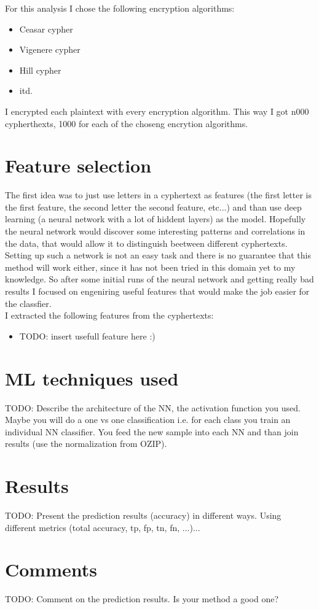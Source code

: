 \documentclass[a4paper]{article}
\begin{document}
For this analysis I chose the following encryption algorithms:

\begin{itemize}
	\item Ceasar cypher
	\item Vigenere cypher
	\item Hill cypher
	\item itd.
\end{itemize}

I encrypted each plaintext with every encryption algorithm. This way I got n000 cypherthexts, 1000 for each of the choseng encrytion algorithms.

\section*{Feature selection}
The first idea was to just use letters in a cyphertext as features (the first letter is the first feature, the second letter the second feature, etc...) and than use deep learning (a neural network with a lot of hiddent layers) as the model. Hopefully the neural network would discover some interesting patterns and correlations in the data, that would allow it to distinguish beetween different cyphertexts. Setting up such a network is not an easy task and there is no guarantee that this method will work either, since it has not been tried in this domain yet to my knowledge. So after some initial runs of the neural network and getting really bad results I focused on engeniring useful features that would make the job easier for the classfier. \\
I extracted the following features from the cyphertexts:

\begin{itemize}
	\item TODO: insert usefull feature here :)
\end{itemize}

\section*{ML techniques used}
TODO: Describe the architecture of the NN, the activation function you used. Maybe you will do a one vs one classification i.e. for each class you train an individual NN classifier. You feed the new sample into each NN and than join results (use the normalization from OZIP).


\section*{Results}
TODO: Present the prediction results (accuracy) in different ways. Using different metrics (total accuracy, tp, fp, tn, fn, ...)...


\section*{Comments}
TODO: Comment on the prediction results. Is your method a good one?



\end{document}

